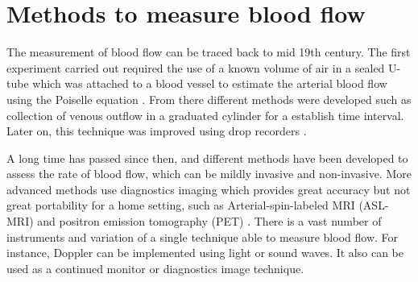 %


\section{Methods to measure blood flow }
The measurement of blood flow can be traced back to mid 19th century. The first experiment carried out required the use of a known volume of air in a sealed U-tube which was attached to a blood vessel to estimate the arterial blood flow using the Poiselle equation \cite{dokunin1958modification}. From there different methods were developed such as collection of venous outflow in a graduated cylinder for a establish time interval. Later on, this technique was improved using drop recorders \cite{jayanthy2011measuring}.

A long time has passed since then, and different methods have been developed to assess the rate of blood flow, which can be mildly invasive and non-invasive. More advanced methods use diagnostics imaging which provides great accuracy but not great portability for a home setting, such as Arterial-spin-labeled MRI (ASL-MRI) \cite{schmitt2003quantitative} and positron emission tomography (PET) \cite{baron1999mapping}. There is a vast number of instruments and variation of a single technique able to measure blood flow. For instance, Doppler can be implemented using light or sound waves. It also can be used as a continued monitor or diagnostics image technique. 


